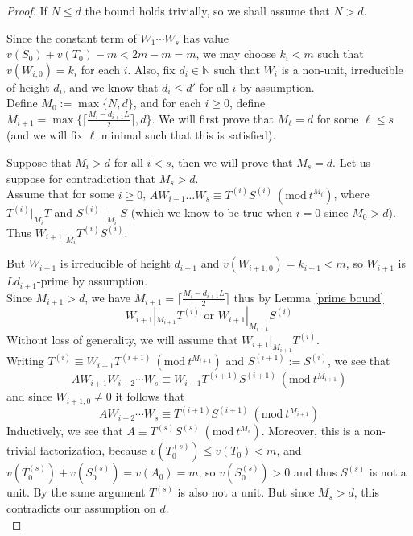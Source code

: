\documentclass{article}
\newcommand{\Mod}[1]{\ (\mathrm{mod}\ #1)}
\theoremstyle{plain}
\theoremstyle{definition}
\theoremstyle{remark}
\theoremstyle{plain}
\begin{document}
\begin{proof}

If $N \leq d$ the bound holds trivially, so we shall assume that $N > d$. 

Since the constant term of $W_1\cdots W_s$ has value $v(S_0)+v(T_0)-m<2m-m=m$, we may choose $k_i<m$ such that $v(W_{i,0})=k_i$ for each $i$. Also, fix $d_i\in\mathbb{N}$ such that $W_i$ is a non-unit, irreducible of height $d_i$, and we know that $d_i\leq d'$ for all $i$ by assumption.\\   

\noindent Define $M_0:=\max\{N,d\}$, and for each $i\geq 0$, define $M_{i+1}=\max\{\lceil\frac{M_{i}-d_{i+1}L}{2}\rceil,d\}$. We will first prove that $M_\ell=d$ for some $\ell\leq s$ (and we will fix $\ell$ minimal such that this is satisfied). 

Suppose that $M_i>d$ for all $i<s$, then we will prove that $M_s=d$. Let us suppose for contradiction that $M_s>d$.\\

\noindent Assume that for some $i\geq 0$, $AW_{i+1}\dots W_{s}\equiv T^{(i)}S^{(i)}\Mod{t^{M_i}}$, where $T^{(i)}|_{M_i} T$ and $S^{(i)}\mid_{M_i} S$ (which we know to be true when $i=0$ since $M_0>d$). Thus $W_{i+1}|_{M_i}T^{(i)}S^{(i)}$.

But $W_{i+1}$ is irreducible of height $d_{i+1}$ and $v(W_{i+1,0})=k_{i+1}<m$, so $W_{i+1}$ is $Ld_{i+1}$-prime by assumption.\\ 

\noindent Since $M_{i+1}>d$, we have $M_{i+1}=\lceil\frac{M_{i}-d_{i+1}L}{2}\rceil$ thus by Lemma \ref{prime bound} $$W_{i+1}|_{M_{i+1}} T^{(i)}\text{ or }W_{i+1}|_{M_{i+1}} S^{(i)}$$ Without loss of generality, we will assume that $W_{i+1}|_{M_{i+1}} T^{(i)}$.\\ 

\noindent Writing $T^{(i)}\equiv W_{i+1}T^{(i+1)}\Mod{t^{M_{i+1}}}$ and $S^{(i+1)}:=S^{(i)}$, we see that $$AW_{i+1}W_{i+2}\cdots W_s\equiv W_{i+1}T^{(i+1)}S^{(i+1)}\Mod{t^{M_{i+1}}}$$ and since $W_{i+1,0}\neq 0$ it follows that $$AW_{i+2}\cdots W_s\equiv T^{(i+1)}S^{(i+1)}\Mod{t^{M_{i+1}}}$$ Inductively, we see that $A\equiv T^{(s)}S^{(s)}\Mod{t^{M_s}}$. Moreover, this is a non-trivial factorization, because $v(T_0^{(s)})\leq v(T_0)<m$, and $v(T_0^{(s)})+v(S_0^{(s)})=v(A_0)=m$, so $v(S_0^{(s)})>0$ and thus $S^{(s)}$ is not a unit. By the same argument $T^{(s)}$ is also not a unit. But since $M_s>d$, this contradicts our assumption on $d$.\\


\end{proof}
\end{document}
